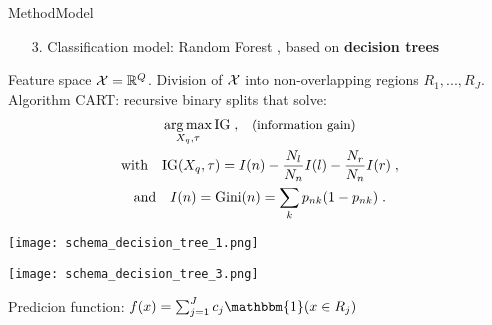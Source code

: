 \begin{frame}{Method}{Model}
\begin{minipage}[t]{0.49\linewidth}
    \vspace{3cm}
    \pause[3]
    \begin{enumerate}
        \item[3.] Classification model: Random Forest \cite{Breiman2001}, based on \textbf{decision trees}
        
    \end{enumerate}
\end{minipage}\hfill
\begin{minipage}[t]{0.49\linewidth}
    \vspace{0pt}
    \begin{tcolorbox}[title=Decision tree,size=title,boxrule=0.2pt]
    \small
    Feature space $\mathcal{X} = \mathbb{R}^Q$.
    Division of $\mathcal{X}$ into non-overlapping regions $R_1,...,R_J$.
    Algorithm CART: recursive binary splits \cite{breiman84} that solve:
    \begin{gather*}
        \operatorname*{arg\,max}_{X_{q}, \tau} \mathrm{IG}\;,  \;\;\;\text{\small{(information gain)}}\\
        \text{with} \quad \mathrm{IG}(X_{q}, \tau) = I(n) - \frac{N_{l}}{N_n}I(l) - \frac{N_{r}}{N_{n}}I(r)\;,\\
        \text{and} \quad I(n) = \mathrm{Gini}(n) = \sum_{k}p_{nk}(1-p_{nk})\;.
    \end{gather*}
    \end{tcolorbox}
    \begin{minipage}[t]{0.49\linewidth}
        \vspace{-5pt}
        \centering
        \texttt{[image: schema\_decision\_tree\_1.png]}\\
    \end{minipage}
    \begin{minipage}[t]{0.49\linewidth}
        \vspace{-5pt}
        \centering
        \texttt{[image: schema\_decision\_tree\_3.png]}\\
    \end{minipage}
    \centering
    \small
    Predicion function:\;
    $f(x) = \sum_{j=1}^{J}c_{j}\mathbbm{1}(x\in R_{j})$

\end{minipage}
\end{frame}

